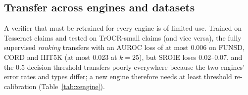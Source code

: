 \subsection{Transfer across engines and datasets}
\begin{table}[t]\centering
\caption{\textbf{Transfer.} Left: engine transfer (train on one engine's claims, test on the other's; in-engine:
trained and tested on the target engine). Right: dataset transfer, macro-F1 (rows: training dataset, fully
supervised; shaded: in-domain).}
\label{tab:xengine}
\footnotesize\setlength{\tabcolsep}{2.6pt}
\begin{minipage}[t]{0.56\linewidth}\centering
{}
\end{minipage}\hfill
\begin{minipage}[t]{0.42\linewidth}\centering
{}
\end{minipage}
\end{table}

A verifier that must be retrained for every engine is of limited use. Trained on Tesseract claims and tested on
TrOCR-small claims (and vice versa), the fully supervised \emph{ranking} transfers with an AUROC loss of at most 0.006 on
FUNSD, CORD and IIIT5K (at most 0.023 at $k=25$), but SROIE loses 0.02--0.07, and the 0.5 decision threshold transfers
poorly everywhere because the two engines' error rates and types differ; a new engine therefore needs at least
threshold re-calibration (Table~\ref{tab:xengine}). \XDSSENTENCE

